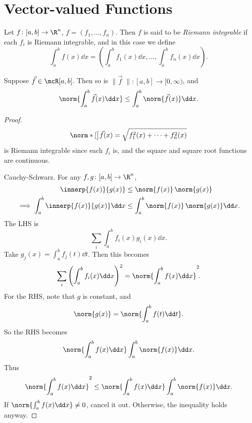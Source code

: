\section{Vector-valued Functions} \label{sec:riemann:vector}

\begin{definition}
    Let $f\colon [a, b] \to \R^n$, $f = (f_1, \dots, f_n)$.
    Then $f$ is said to be \emph{Riemann integrable} if each $f_i$
    is Riemann integrable, and in this case we define \[
        \int_a^b f(x) \dd x
            = \left( \int_a^b f_1(x) \dd x, \dots, \int_a^b f_n(x) \dd x \right).
    \]
\end{definition}

\begin{theorem} \label{thm:riemann:triangle}
    Suppose $\vec{f} \in \mcR[a, b]$.
    Then so is $\lVert{\vec{f}}\;\rVert\colon [a, b] \to [0, \infty)$,
    and \[
        \norm{\int_a^b \vec{f}(x) \dd x}
            \le \int_a^b \norm{\vec{f}(x)} \dd x.
    \]
\end{theorem}
\begin{proof}
    \[
        \norm*[\big]{\vec f(x)} = \sqrt{f_1^2(x) + \dots + f_n^2(x)}
    \] is Riemann integrable since each $f_i$ is, and the square and
    square root functions are continuous.

    Cauchy-Schwarz.
    For any $f, g \colon [a, b] \to \R^n$, \begin{align*}
        \innerp{f(x)}{g(x)}
            &\le \norm{f(x)} \, \norm{g(x)} \\
        \implies \int_a^b \innerp{f(x)}{g(x)} \dd x
            &\le \int_a^b \norm{f(x)} \, \norm{g(x)} \dd x.
    \end{align*}
    The LHS is \[
        \sum_i \int_a^b f_i(x) g_i(x) \dd x.
    \] Take $g_j(x) = \int_{a}^{b} f_j(t) \dd t$.
    Then this becomes \[
        \sum_i \left(\int_{a}^{b} f_i(x) \dd x\right)^2
            = \norm{\int_{a}^{b} f(x) \dd x}^2\!.
    \]
    For the RHS, note that $g$ is constant, and \[
        \norm{g(x)} = \norm{\int_a^b f(t) \dd t}.
    \] So the RHS becomes \[
        \norm{\int_a^b f(x) \dd x} \int_a^b \norm{f(x)} \dd x.
    \]
    Thus \[
        \norm{\int_a^b f(x) \dd x}^2
            \le \norm{\int_a^b f(x) \dd x} \int_a^b \norm{f(x)} \dd x.
    \] If $\norm{\int_a^b f(x) \dd x} \ne 0$, cancel it out.
    Otherwise, the inequality holds anyway.
\end{proof}

